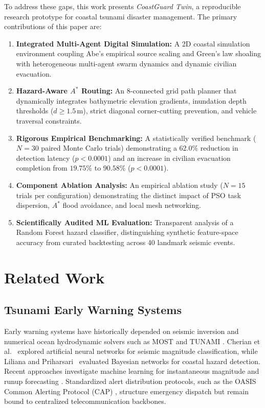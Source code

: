 \documentclass[conference]{IEEEtran}
\begin{document}
To address these gaps, this work presents \textit{CoastGuard Twin}, a reproducible research prototype for coastal tsunami disaster management. The primary contributions of this paper are:
\begin{enumerate}
    \item \textbf{Integrated Multi-Agent Digital Simulation:} A 2D coastal simulation environment coupling Abe's empirical source scaling and Green's law shoaling with heterogeneous multi-agent swarm dynamics and dynamic civilian evacuation.
    \item \textbf{Hazard-Aware $A^*$ Routing:} An 8-connected grid path planner that dynamically integrates bathymetric elevation gradients, inundation depth thresholds ($d \ge 1.5$\,m), strict diagonal corner-cutting prevention, and vehicle traversal constraints.
    \item \textbf{Rigorous Empirical Benchmarking:} A statistically verified benchmark ($N = 30$ paired Monte Carlo trials) demonstrating a 62.0\% reduction in detection latency ($p < 0.0001$) and an increase in civilian evacuation completion from $19.75\%$ to $90.58\%$ ($p < 0.0001$).
    \item \textbf{Component Ablation Analysis:} An empirical ablation study ($N = 15$ trials per configuration) demonstrating the distinct impact of PSO task dispersion, $A^*$ flood avoidance, and local mesh networking.
    \item \textbf{Scientifically Audited ML Evaluation:} Transparent analysis of a Random Forest hazard classifier, distinguishing synthetic feature-space accuracy from curated backtesting across 40 landmark seismic events.
\end{enumerate}

\section{Related Work}
\subsection{Tsunami Early Warning Systems}
Early warning systems have historically depended on seismic inversion and numerical ocean hydrodynamic solvers such as MOST and TUNAMI \cite{titov2005, pradana2022}. Cherian et al.~\cite{cherian2010} explored artificial neural networks for seismic magnitude classification, while Liliana and Priharsari~\cite{liliana2019} evaluated Bayesian networks for coastal hazard detection. Recent approaches investigate machine learning for instantaneous magnitude and runup forecasting \cite{kennedy2025}. Standardized alert distribution protocols, such as the OASIS Common Alerting Protocol (CAP) \cite{ieee1855}, structure emergency dispatch but remain bound to centralized telecommunication backbones.
\end{document}
